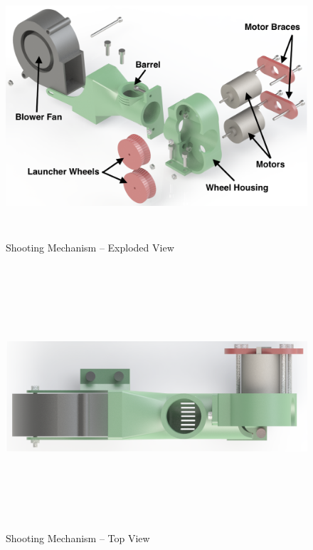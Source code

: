 \begin{figure}[H]   %
	\centering \includegraphics[width=6in, height=3.85in, keepaspectratio]{figures/shooter_explode.png}
	\caption{Shooting Mechanism -- Exploded View}	\label{fig:shooter_explode}
\end{figure}
\begin{figure}[H]   %
	\centering \includegraphics[width=6in, height=3.85in, keepaspectratio]{figures/shooter_top.png}
	\caption{Shooting Mechanism -- Top View}	\label{fig:shooter_top}
\end{figure}

